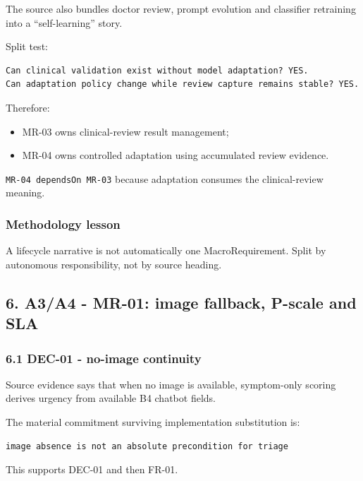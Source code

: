 \documentclass[11pt,a4paper]{article}
\providecommand{\tightlist}{\setlength{\itemsep}{0pt}\setlength{\parskip}{0pt}}
\begin{document}
The source also bundles doctor review, prompt evolution and classifier
retraining into a ``self-learning'' story.

Split test:

\begin{verbatim}
Can clinical validation exist without model adaptation? YES.
Can adaptation policy change while review capture remains stable? YES.
\end{verbatim}

Therefore:

\begin{itemize}
\tightlist
\item
  MR-03 owns clinical-review result management;
\item
  MR-04 owns controlled adaptation using accumulated review evidence.
\end{itemize}

\texttt{MR-04\ dependsOn\ MR-03} because adaptation consumes the
clinical-review meaning.

\subsubsection{Methodology lesson}\label{methodology-lesson-1}

A lifecycle narrative is not automatically one MacroRequirement. Split
by autonomous responsibility, not by source heading.

\subsection{6. A3/A4 - MR-01: image fallback, P-scale and
SLA}\label{6-a3a4---mr-01-image-fallback-p-scale-and-sla}

\subsubsection{6.1 DEC-01 - no-image
continuity}\label{61-dec-01---no-image-continuity}

Source evidence says that when no image is available, symptom-only
scoring derives urgency from available B4 chatbot fields.

The material commitment surviving implementation substitution is:

\begin{verbatim}
image absence is not an absolute precondition for triage
\end{verbatim}

This supports DEC-01 and then FR-01.
\end{document}

